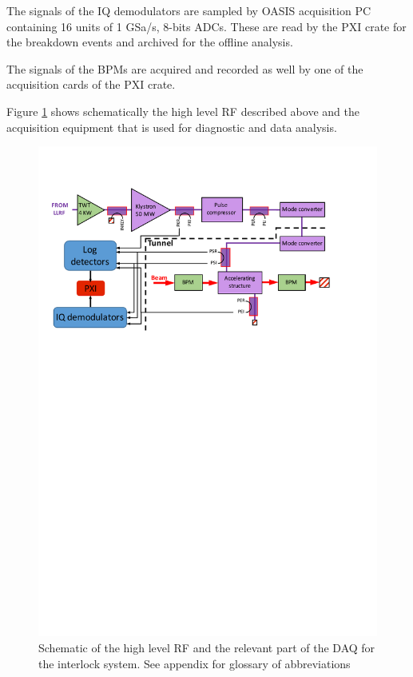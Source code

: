 The signals of the IQ demodulators are sampled by OASIS acquisition PC containing 16 units of 1 GSa/s, 8-bits ADCs. These are read by the PXI crate for the breakdown events and archived for the offline analysis. 

The signals of the BPMs are acquired and recorded as well by one of the acquisition cards of the PXI crate.

Figure \ref{high_l_RF} shows schematically the high level RF described above and the acquisition equipment that is used for diagnostic and data analysis.

\begin{figure}[h]
\centering 
\includegraphics[scale=0.8]{pictures/high-level-RF-scheme.pdf}
\caption{Schematic of the high level RF and the relevant part of the DAQ for the interlock system. See appendix for glossary of abbreviations}
\label{high_l_RF}
\end{figure}



